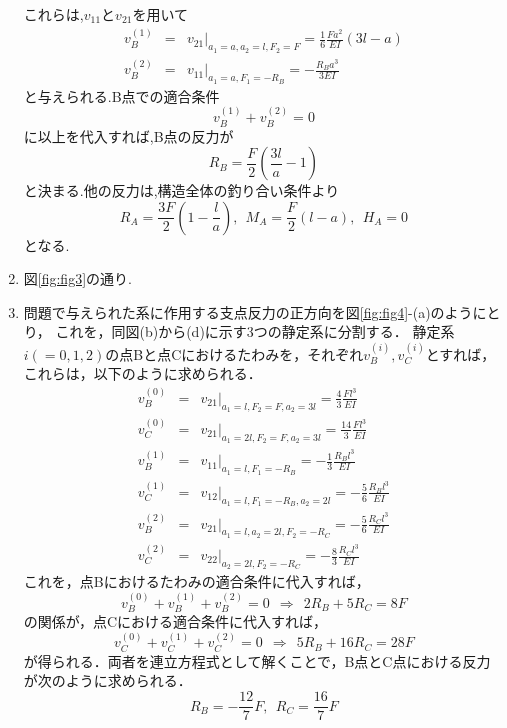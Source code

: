 \documentclass[10pt,a4j]{jarticle}
\begin{document}
\begin{enumerate}
	これらは,$v_{11}$と$v_{21}$を用いて
	\begin{eqnarray}
		v_B^{(1)} &=& \left. v_{21}\right|_{a_1=a,a_2=l, F_2=F}= \frac{1}{6}\frac{Fa^2}{EI}(3l-a) \\
		v_B^{(2)} &=& \left. v_{11}\right|_{a_1=a, F_1=-R_B}= -\frac{R_Ba^3}{3EI}  
	\end{eqnarray}
	と与えられる.B点での適合条件
	\begin{equation}
		v_B^{(1)}+v_B^{(2)}=0 
	\end{equation}
	に以上を代入すれば,B点の反力が
	\begin{equation}
		R_B=\frac{F}{2}\left(\frac{3l}{a}-1\right)
	\end{equation}
	と決まる.他の反力は,構造全体の釣り合い条件より
	\begin{equation}
		R_A=\frac{3F}{2}\left(1-\frac{l}{a}\right), \ \ 
		M_A=\frac{F}{2}(l-a) ,\ \ H_A=0
		\label{eqn:}
	\end{equation}
	となる.
\item
	図\ref{fig:fig3}の通り.
\item
	問題で与えられた系に作用する支点反力の正方向を図\ref{fig:fig4}-(a)のようにとり，
	これを，同図(b)から(d)に示す3つの静定系に分割する．
	静定系$i(=0,1,2)$の点Bと点Cにおけるたわみを，それぞれ$v^{(i)}_B,v^{(i)}_C$とすれば，
	これらは，以下のように求められる．
	\begin{eqnarray}
		v_B^{(0)} &=& \left. v_{21}\right|_{a_1=l, F_2=F,a_2=3l}= \frac{4}{3}\frac{Fl^3}{EI} \\ 
		v_C^{(0)} &=& \left. v_{21}\right|_{a_1=2l, F_2=F, a_2=3l}= \frac{14}{3}\frac{Fl^3}{EI}\\
		v_B^{(1)} &=& \left. v_{11}\right|_{a_1=l, F_1=-R_B}= -\frac{1}{3}\frac{R_Bl^3}{EI} \\ 
		v_C^{(1)} &=& \left. v_{12}\right|_{a_1=l, F_1=-R_B, a_2=2l}= -\frac{5}{6}\frac{R_Bl^3}{EI}\\
		v_B^{(2)} &=& \left. v_{21}\right|_{a_1=l, a_2=2l, F_2=-R_C}= -\frac{5}{6}\frac{R_Cl^3}{EI} \\ 
		v_C^{(2)} &=& \left. v_{22}\right|_{a_2=2l, F_2=-R_C}= -\frac{8}{3}\frac{R_Cl^3}{EI}
	\end{eqnarray}
	これを，点Bにおけるたわみの適合条件に代入すれば，
	\begin{equation}
		v_B^{(0)}+v_B^{(1)}+v_B^{(2)}=0 \ \ \Rightarrow \ \ 2R_B+5R_C=8F
		\label{eqn:}
	\end{equation}
	の関係が，点Cにおける適合条件に代入すれば，
	\begin{equation}
		v_C^{(0)}+v_C^{(1)}+v_C^{(2)}=0 \ \ \Rightarrow \ \ 5R_B+16R_C=28F
		\label{eqn:}
	\end{equation}
	が得られる．両者を連立方程式として解くことで，B点とC点における反力が次のように求められる．
	\begin{equation}
		R_B=-\frac{12}{7}F, \ \ R_C=\frac{16}{7}F
		\label{eqn:}
	\end{equation}
\end{enumerate}
\end{document}
